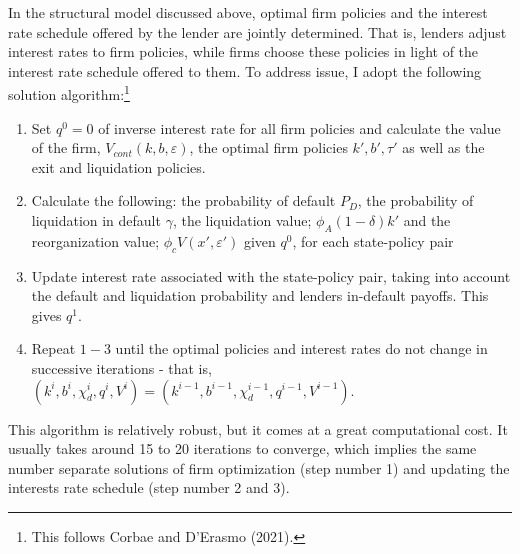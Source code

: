 \documentclass[12pt]{article}
\begin{document}
In the structural model discussed above, optimal firm policies and the interest rate schedule offered by the lender are jointly determined. That is, lenders adjust interest rates to firm policies, while firms choose these policies in light of the interest rate schedule offered to them. To address issue, I adopt the following solution algorithm:\footnote{This follows Corbae and D'Erasmo (2021).}
\begin{enumerate}
    \item Set $q^0 = 0$ of inverse interest rate for all firm policies and calculate the value of the firm, $V_{cont}(k,b,\varepsilon)$, the optimal firm policies $k', b', \tau'$ as well as the exit and liquidation policies. 
    \item Calculate the following: the probability of default $P_D$, the probability of liquidation in default $\gamma$, the liquidation value; $\phi_A (1-\delta) k'$ and the reorganization value; $\phi_c V (x', \varepsilon')$ given $q^0$, for each state-policy pair
    \item Update interest rate associated with the state-policy pair, taking into account the default and liquidation probability and lenders in-default payoffs. This gives $q^1$. 
    \item Repeat $1-3$ until the optimal policies and interest rates do not change in successive iterations - that is, $ (k^{i},b^{i},\chi_d^{i},q^{i}, V^{i}) = (k^{i-1},b^{i-1},\chi_d^{i-1}, q^{i-1}, V^{i-1}) $.
\end{enumerate}
This algorithm is relatively robust, but it comes at a great computational cost. It usually takes around 15 to 20 iterations to converge, which implies the same number separate solutions of firm optimization (step number 1) and updating the interests rate schedule (step number 2 and 3). 
\end{document}
